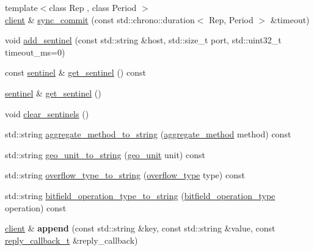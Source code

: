 \begin{DoxyCompactItemize}
\item 
{\footnotesize template$<$class Rep , class Period $>$ }\\\mbox{\hyperlink{classcpp__redis_1_1client}{client}} \& \mbox{\hyperlink{classcpp__redis_1_1client_a79a24c8367cb1229fd2c4c38d0f82533}{sync\+\_\+commit}} (const std\+::chrono\+::duration$<$ Rep, Period $>$ \&timeout)
\item 
void \mbox{\hyperlink{classcpp__redis_1_1client_abd52019ee708559179c501892e6448dc}{add\+\_\+sentinel}} (const std\+::string \&host, std\+::size\+\_\+t port, std\+::uint32\+\_\+t timeout\+\_\+ms=0)
\item 
const \mbox{\hyperlink{classcpp__redis_1_1sentinel}{sentinel}} \& \mbox{\hyperlink{classcpp__redis_1_1client_a8325d57c88811254f9f9dab8030d7e8c}{get\+\_\+sentinel}} () const
\item 
\mbox{\hyperlink{classcpp__redis_1_1sentinel}{sentinel}} \& \mbox{\hyperlink{classcpp__redis_1_1client_a2fa17b8fbc245a190389d95083857cc4}{get\+\_\+sentinel}} ()
\item 
void \mbox{\hyperlink{classcpp__redis_1_1client_ad693f26b02113e4a776856aca8dd7796}{clear\+\_\+sentinels}} ()
\item 
std\+::string \mbox{\hyperlink{classcpp__redis_1_1client_accc567df4dd23b30defdd9605719e0ca}{aggregate\+\_\+method\+\_\+to\+\_\+string}} (\mbox{\hyperlink{classcpp__redis_1_1client_aa197ca5b36da793c701d3ba388ec4946}{aggregate\+\_\+method}} method) const
\item 
std\+::string \mbox{\hyperlink{classcpp__redis_1_1client_aa8a686097a5340eb50e838f14342e302}{geo\+\_\+unit\+\_\+to\+\_\+string}} (\mbox{\hyperlink{classcpp__redis_1_1client_aa5998536fd32ff4387c89be514997620}{geo\+\_\+unit}} unit) const
\item 
std\+::string \mbox{\hyperlink{classcpp__redis_1_1client_a696a7fa2b06245323eca8c232d307585}{overflow\+\_\+type\+\_\+to\+\_\+string}} (\mbox{\hyperlink{classcpp__redis_1_1client_a4119182ad3a01c1bb626a174375e114a}{overflow\+\_\+type}} type) const
\item 
std\+::string \mbox{\hyperlink{classcpp__redis_1_1client_a11a73f30d14e6d27f6c8c8cee53a3a04}{bitfield\+\_\+operation\+\_\+type\+\_\+to\+\_\+string}} (\mbox{\hyperlink{classcpp__redis_1_1client_a2e2023534299541da0a659802e2f087d}{bitfield\+\_\+operation\+\_\+type}} operation) const
\item 
\mbox{\label{classcpp__redis_1_1client_ad60647638d8758103e98894457652b84}} 
\mbox{\hyperlink{classcpp__redis_1_1client}{client}} \& {\bfseries append} (const std\+::string \&key, const std\+::string \&value, const \mbox{\hyperlink{classcpp__redis_1_1client_af7a65eb21aa25230bfbb0b0203c4fc04}{reply\+\_\+callback\+\_\+t}} \&reply\+\_\+callback)

\end{DoxyCompactItemize}
